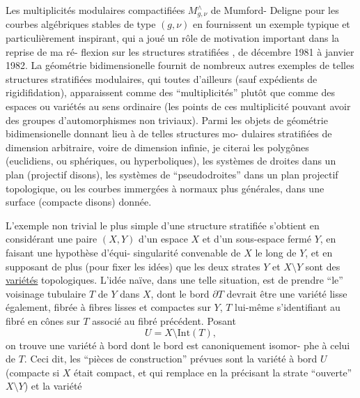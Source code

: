 
Les multiplicités modulaires compactifiées $M^{\wedge}_{g,\nu}$ de Mumford-%
Deligne pour les courbes algébriques stables de type $(g,\nu)$ en
fournissent un exemple typique et particulièrement inspirant, qui
a joué un rôle de motivation important dans la reprise de ma ré-%
flexion sur les structures stratifiées , de décembre 1981 à janvier
1982. La géométrie bidimensionelle fournit de nombreux autres
exemples de telles structures stratifiées modulaires, qui toutes
d'ailleurs (sauf expédients de rigidifidation), apparaissent
comme des ``multiplicités'' plutôt que comme des espaces ou variétés
au sens ordinaire (les points de ces multiplicité pouvant avoir
des groupes d'automorphismes non triviaux). Parmi les objets de
géométrie bidimensionelle donnant lieu à de telles structures mo-%
dulaires stratifiées de dimension arbitraire, voire de dimension
infinie, je citerai les polygônes (euclidiens, ou sphériques, ou
hyperboliques), les systèmes de droites dans un plan (projectif
disons), les systèmes de ``pseudodroites'' dans un plan projectif
topologique, ou les courbes immergées à  normaux plus
générales, dans une surface (compacte disons) donnée.

L'exemple non trivial le plus simple d'une structure
stratifiée s'obtient en considérant une paire $(X,Y)$ d'un espace
$X$ et d'un sous-espace fermé $Y$, en faisant une hypothèse d'équi-%
singularité convenable de $X$ le long de $Y$, et en supposant de
plus (pour fixer les idées) que les deux strates $Y$ et $X\setminus Y$ sont
des \uline{variétés} topologiques. L'idée naïve, dans une telle situation,
est de prendre ``le'' voisinage tubulaire $T$ de $Y$ dans $X$, dont
le bord $\partial T$ devrait être une variété lisse également, fibrée à
fibres lisses et compactes sur $Y$, $T$ lui-même s'identifiant au
fibré en cônes sur $T$ associé au fibré précédent. Posant
\[ U = X \setminus \mathrm{Int}(T), \]
on trouve une variété à bord dont le bord est canoniquement isomor-%
phe à celui de $T$. Ceci dit, les ``pièces de construction'' prévues
sont la variété à bord $U$ (compacte si $X$ était compact, et qui
remplace en la précisant la strate ``ouverte'' $X\setminus Y$) et la variété

